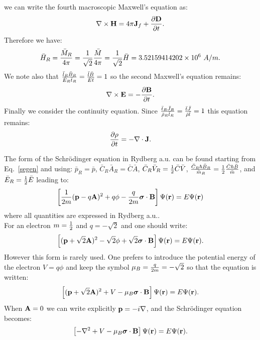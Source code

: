 \documentclass[12pt,a4paper]{article}
\def\barhry{3.52159414202\times 10^{6}}
\begin{document}
{\begin{equation}
\end{equation}
we can write the fourth macroscopic Maxwell's equation as:
\begin{equation}
\nabla \times {\bf H}= 4 \pi 
{\bf J}_f + {\partial {\bf D} \over \partial t}.
\end{equation}
Therefore we have:
\begin{equation}
\bar H_R ={\bar M_R \over 4 \pi}={1\over \sqrt{2}} {\bar M \over 4 \pi}=
{1\over \sqrt{2}} \bar H=\barhry\ A/m.
\end{equation}
We note also that ${\bar l_R \bar B_R \over \bar E_R \bar t_R}=
{\bar l \bar B \over \bar E \bar t}=1$ so the second Maxwell's equation
remains:
\begin{equation}
\nabla \times {\bf E}=-{\partial {\bf B} \over \partial t}.
\end{equation}
Finally we consider the continuity equation. Since
${\bar t_R \bar J_R \over \bar \rho_R \bar l_R}={\bar t \bar J 
\over \bar \rho \bar l}=1$ this equation remains:
\begin{equation}
{\partial \rho \over \partial t}=-\nabla \cdot {\bf J}.
\end{equation}

The form of the Schr\"odinger equation in Rydberg a.u.
can be found starting from Eq.~\ref{segen} and using:
$\bar p_{R}=\bar p$, $\bar C_R \bar A_R= \bar C \bar A$,
$\bar C_R \bar V_R= {1\over 2} \bar C \bar V$,  
${\bar C_R \hbar \bar B_R \over \bar m_R}
= {1\over 2} {\bar C \hbar \bar B \over \bar m}$,
and $\bar E_R={1\over 2} \bar E$ leading to:
\begin{equation}
\left[{1\over 2m} ({\bf p}- q {\bf A})^2 + 
q \phi - 
{q \over 2 m} 
{\boldsymbol \sigma} \cdot {\bf B} \right]
\Psi({\bf r})= E \Psi({\bf r})
\end{equation}
where all quantities are expressed in Rydberg a.u.. \\

For an electron 
$m={1\over 2}$ and $q=-\sqrt{2}$ and one should write:
\begin{equation}
\left[({\bf p}+ \sqrt{2} {\bf A})^2  
- \sqrt{2} \phi + \sqrt{2}
{\boldsymbol \sigma} \cdot {\bf B} \right]
\Psi({\bf r})= E \Psi({\bf r}).
\end{equation}
However this form is rarely used. One prefers to introduce the potential
energy of the electron $V=q\phi$ and keep the symbol $\mu_B={q \over 2 m}
=-\sqrt{2}$ 
so that the equation is written:
\begin{equation}
\left[({\bf p}+ \sqrt{2} {\bf A})^2  
+ V - \mu_B {\boldsymbol \sigma} \cdot {\bf B} \right]
\Psi({\bf r})= E \Psi({\bf r}).
\end{equation}
When ${\bf A}=0$ we can write explicitly ${\bf p}=-i \nabla$, and
the Schr\"odinger equation becomes:
\begin{equation}
\left[-\nabla^2  
+ V - \mu_B {\boldsymbol \sigma} \cdot {\bf B} \right]
\Psi({\bf r})= E \Psi({\bf r}).
\end{equation}
}
\newpage
\end{document}
